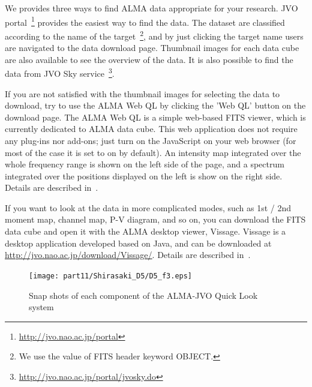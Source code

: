 We provides three ways to find ALMA data appropriate for your research.
JVO portal~\footnote{\url{http://jvo.nao.ac.jp/portal}}\citep{Shirasaki_2011} 
provides the easiest way to find the data.
The dataset are classified according to the name of the target~\footnote{We use the 
value of FITS header keyword OBJECT.}, and by just clicking the target name
users are navigated to the data download page.
Thumbnail images for each data cube are also available to see the overview of 
the data.
It is also possible to find the data from JVO Sky 
service~\footnote{\url{http://jvo.nao.ac.jp/portal/jvosky.do}}.

If you are not satisfied with the thumbnail images for selecting the data to download,
try to use the ALMA Web QL by clicking the 'Web QL' button on the download page.
The ALMA Web QL is a simple web-based FITS viewer, which is currently dedicated 
to ALMA data cube.
This web application does not require any plug-ins nor add-ons; just turn on
the JavaScript on your web browser (for most of the case it is set to on by default).
An intensity map integrated over the whole frequency range is shown on the left side
of the page, and a spectrum integrated over the positions displayed on the left
is show on the right side.
Details are described in~\cite{O10_adassxxii}.

If you want to look at the data in more complicated modes, such as 
1st / 2nd moment map, channel map, P-V diagram, and so on, you can download the 
FITS data cube and open it with the ALMA desktop viewer, Vissage.
Vissage is a desktop application developed based on Java, and can be
downloaded at \url{http://jvo.nao.ac.jp/download/Vissage/}.
Details are described in~\cite{P047_adassxxii}.


\begin{figure}[t]
\begin{center}
\texttt{[image: part11/Shirasaki\_D5/D5\_f3.eps]}
\caption{Snap shots of each component of the ALMA-JVO Quick Look system}
\label{Shfig:arch}
\end{center}
\end{figure}


